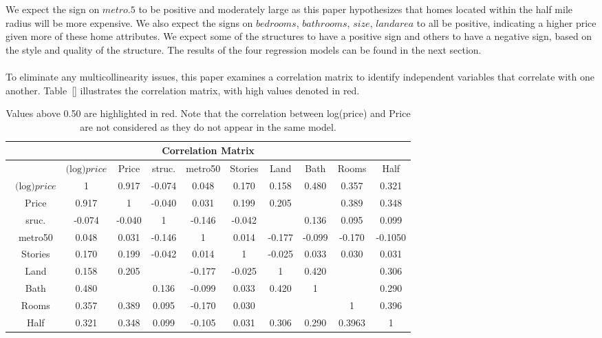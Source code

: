 \documentclass[12pt]{report}
\newcommand\tab[1][.60cm]{\hspace*{#1}}
\begin{document}
\tab We expect the sign on $metro.5$ to be positive and moderately large as this paper hypothesizes that homes located within the half mile radius will be more expensive. We also expect the signs on $bedrooms$, $bathrooms$, $size$, $landarea$ to all be positive, indicating a higher price given more of these home attributes. We expect some of the structures to have a positive sign and others to have a negative sign, based on the style and quality of the structure. The results of the four regression models can be found in the next section.\\ \\
\tab To eliminate any multicollinearity issues, this paper examines a correlation matrix to identify independent variables that correlate with one another. Table~\ref{} illustrates the correlation matrix, with high values denoted in red.
\begin{table}[h!]
\centering
\begin{tabular}{|c| c | c |c |c |c |c |c | c | c|} 
\hline
\multicolumn{10}{|c|}{ \textbf{Correlation Matrix}} \\
\hline\hline
&$\text{(log)}price$& Price& struc. & metro50& Stories& Land& Bath& Rooms& Half\\[0.5ex] \hline \ 
$\text{(log)}price$& 1& 0.917& -0.074& 0.048& 0.170& 0.158& 0.480 & 0.357& 0.321\\ [0.5ex]\hline \ 
Price& 0.917& 1&-0.040& 0.031& 0.199& 0.205& \textbf{\color{red}{0.524}}& 0.389& 0.348\\ [0.5ex]\hline\ 
sruc.& -0.074& -0.040 & 1& -0.146& -0.042 & \textbf{\color{red}{0.505}}& 0.136& 0.095& 0.099 \\ [0.5ex]\hline \ 
metro50& 0.048 & 0.031&-0.146& 1& 0.014& -0.177& -0.099& -0.170& -0.1050\\ [0.5ex] \hline \ 
Stories& 0.170 & 0.199&-0.042& 0.014& 1& -0.025& 0.033& 0.030& 0.031\\ [0.5ex]\hline \ 
Land& 0.158& 0.205&\textbf{\color{red}{0.505}}& -0.177& -0.025& 1& 0.420 & \textbf{\color{red}{0.505}}& 0.306\\ [0.5ex] \hline \ 
Bath& 0.480& \textbf{\color{red}{0.524}}&0.136& -0.099& 0.033& 0.420&1& \textbf{\color{red}{0.694}}& 0.290\\ [0.5ex]\hline \ 
Rooms& 0.357& 0.389&0.095 & -0.170& 0.030& \textbf{\color{red}{0.506}}& \textbf{\color{red}{0.694}}& 1& 0.396 \\ [0.5ex]\hline \ 
Half& 0.321& 0.348&0.099& -0.105& 0.031& 0.306& 0.290& 0.3963& 1 \\ [0.5ex]\hline
\hline
\end{tabular}
\caption{\footnotesize Values above 0.50 are highlighted in red. Note that the correlation between log(price) and Price are not considered as they do not appear in the same model.}
\label{table:1}
\end{table}
\end{document}
